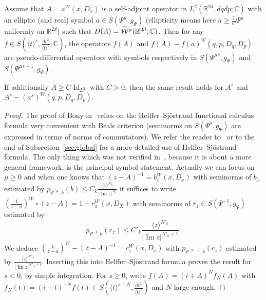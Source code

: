 \documentclass[10pt]{amsart}
\theoremstyle{definition}\newtheorem{defi}[theo]{Definition}\newtheorem{rema}[theo]{Remark}\newtheorem{exam}[theo]{Example}\newtheorem{exem}[theo]{Example}\newtheorem{nota}[theo]{Notation}
\newcommand{\C}{\mathbb{C}}
\newcommand{\R}{\mathbb{R}}
\newcommand{\clW}{\mathcal{W}}
\DeclareMathOperator{\Idd}{Id}
\DeclareMathOperator{\Imm}{Im}
\let\oldtilde\tilde
\renewcommand*{\tilde}[1]{\mathchoice{\widetilde{#1}}{\widetilde{#1}}{\oldtilde{#1}}{\oldtilde{#1}}}
\begin{document}
\begin{prop}\label{pr:Bealsfunction}
Assume that $A=a^{W}(x,D_{x})$ is a self-adjoint operator in $L^{2}(\R^{2d},dqdp;\C)$ with an elliptic (and real) symbol $a\in S(\Psi^{\mu},g_{\Psi})$ (ellipticity means here $a\geq \frac{1}{C}\Psi^{\mu}$ uniformly on $\R^{2d}$) such that $D(A)=\tilde{\clW}^{\mu}(\R^{2d};\C)$. Then for any $f\in S(\langle t\rangle^{s}, \frac{dt^{2}}{\langle t\rangle^{2}}; \C)$, the operators $f(A)$ and $f(A)-f(a)^{W}(q,p,D_{q},D_{p})$ are pseudo-differential operators with symbols respectively in $S(\Psi^{\mu s},g_{\Psi})$ and $S(\Psi^{\mu s-1},g_{\Psi})$.

If additionally $A\geq C\Idd_{L^{2}}$ with $C>0$, then the same result holds for $A^{s}$ and $A^{s}-(a^{s})^{W}(q,p,D_{q},D_{p})$.
\end{prop}
\begin{proof}
The proof of Bony in~\cite[Theorem~3.8]{Bon} relies on the Helffer--Sj\"ostrand functional calculus formula very convenient with Beals criterion (seminorms on $S(\Psi^{s},g_{\Psi})$ are expressed in terms of norms of commutators). We refer the reader to~\cite{Bon,DiSj,HeSj} or to the end of Subsection~\ref{sec:global} for a more detailed use of Helffer--Sj\"ostrand formula. The only thing which was not verified in~\cite{Bon}, because it is about a more general framework, is the principal symbol statement. Actually we can focus on $\mu\geq 0$ and when one knows that $(z-A)^{-1}=b_{z}^{W}(x,D_{x})$ with seminorms of $b_{z}$ estimated by $p_{\Psi^{-\mu},k}(b)\leq C_{k}\frac{\langle z\rangle^{N_{k}}}{|\Imm z|^{N_{k}}}$ it suffices to write $(\frac{1}{z-a})^{W}\circ(z-A)=1+r^{W}_{z}(x,D_{X})$ with seminorms of $r_{z}\in S(\Psi^{-1},g_{\Psi})$ estimated by
\[
p_{\Psi^{-1}, k}(r_{z})\leq C'_{k}\frac{\langle z\rangle^{N'_{k}}}{|\Imm z|^{N'_{k}+1}}.
\]
We deduce $(\frac{1}{z-a})^{W}-(z-A)^{-1}=c_{z}^{W}(x,D_{x})$ with $p_{\Psi^{-\mu-1},k}(c_{z})$ estimated by $\frac{\langle z\rangle^{N''_{k}}}{|\Imm z|^{N''_{k}+1}}$. Inserting this into Helffer--Sj\"ostrand formula proves the result for $s<0$, by simple integration. For $s\geq 0$, write $f(A)=(i+A)^{N}f_{N}(A)$ with $f_{N}(t)=(i+t)^{-N}f(t)\in S(\langle t\rangle^{s-N},\frac{dt^{2}}{\langle t\rangle^{2}})$ and $N$ large enough.
\end{proof}
\end{document}
